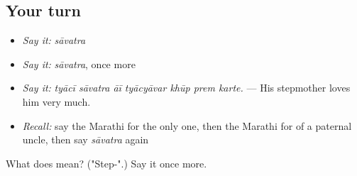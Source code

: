\subsection*{Your turn}
\begin{itemize}
\raggedright
  \item \emph{Say it:} \emph{sāvatra}
  \item \emph{Say it:} \emph{sāvatra}, once more
  \item \emph{Say it:} \emph{tyācī sāvatra āī tyācyāvar khūp prem karte.} — His stepmother loves him very much.
  \item \emph{Recall:} say the Marathi for the only one, then the Marathi for of a paternal uncle, then say \emph{sāvatra} again
\end{itemize}

\begin{tcolorbox}[breakable,colback=teal!4,colframe=teal!35!black,title={Before you move on}]
What does  mean? ("Step-".) Say it once more.
\end{tcolorbox}
